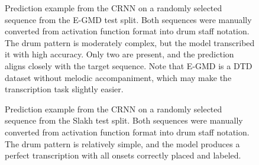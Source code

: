 \begin{figure}[H]
    \centering
    \caption{Prediction example from the \acrfull{CRNN} on a randomly selected sequence from the E-GMD test split. Both sequences were manually converted from activation function format into drum staff notation. The drum pattern is moderately complex, but the model transcribed it with high accuracy. Only two  are present, and the prediction aligns closely with the target sequence. Note that E-GMD is a \gls{DTD} dataset without melodic accompaniment, which may make the transcription task slightly easier.}
    \label{ArchitecturePredictionComparisonEGMDFigure}
\end{figure}

\begin{figure}[H]
    \centering
    \caption{Prediction example from the \acrfull{CRNN} on a randomly selected sequence from the Slakh test split. Both sequences were manually converted from activation function format into drum staff notation. The drum pattern is relatively simple, and the model produces a perfect transcription with all onsets correctly placed and labeled.}
    \label{ArchitecturePredictionComparisonSlakhFigure}
\end{figure}

